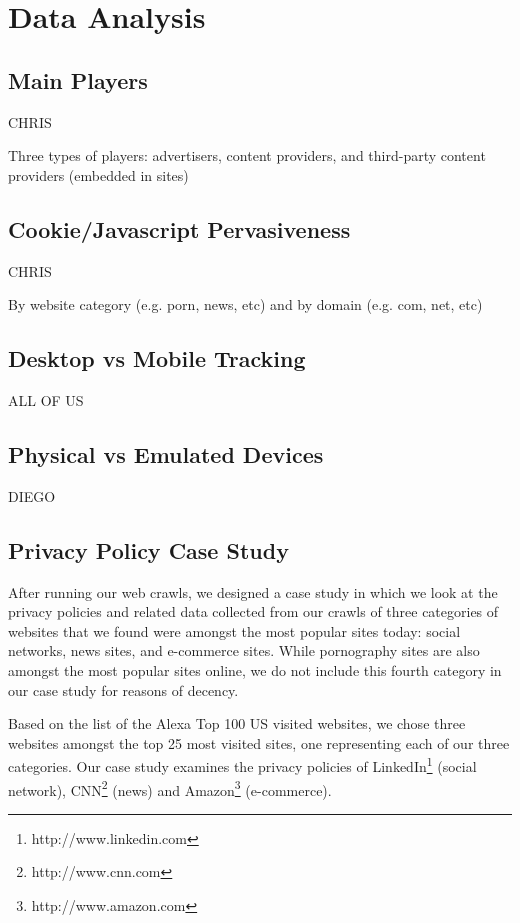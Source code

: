 \documentclass{acm_proc_article-sp}
\begin{document}
\section{Data Analysis}

\subsection{Main Players}
CHRIS

Three types of players: advertisers, content providers, and third-party content providers (embedded in sites)

\subsection{Cookie/Javascript Pervasiveness}
CHRIS

By website category (e.g. porn, news, etc) and by domain (e.g. com, net, etc)

\subsection{Desktop vs Mobile Tracking}
ALL OF US

\subsection{Physical vs Emulated Devices}
DIEGO

\subsection{Privacy Policy Case Study}
After running our web crawls, we designed a case study in which we look at the privacy policies and related data collected from our crawls of three categories of websites that we found were amongst the most popular sites today: social networks, news sites, and e-commerce sites. While pornography sites are also amongst the most popular sites online, we do not include this fourth category in our case study for reasons of decency. 

Based on the list of the Alexa Top 100 US visited websites, we chose three websites amongst the top 25 most visited sites, one representing each of our three categories. Our case study examines the privacy policies of LinkedIn\footnote{http://www.linkedin.com} (social network), CNN\footnote{http://www.cnn.com} (news) and Amazon\footnote{http://www.amazon.com} (e-commerce).
\end{document}
